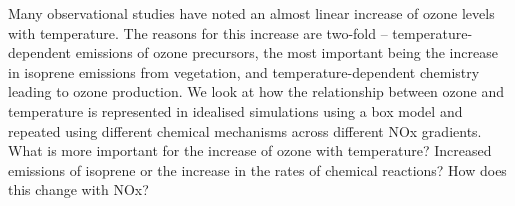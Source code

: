 Many observational studies have noted an almost linear increase of ozone levels with temperature.
The reasons for this increase are two-fold -- temperature-dependent emissions of ozone precursors, the most important being the increase in isoprene emissions from vegetation, and temperature-dependent chemistry leading to ozone production.
We look at how the relationship between ozone and temperature is represented in idealised simulations using a box model and repeated using different chemical mechanisms across different NOx gradients.
What is more important for the increase of ozone with temperature? Increased emissions of isoprene or the increase in the rates of chemical reactions? How does this change with NOx?
